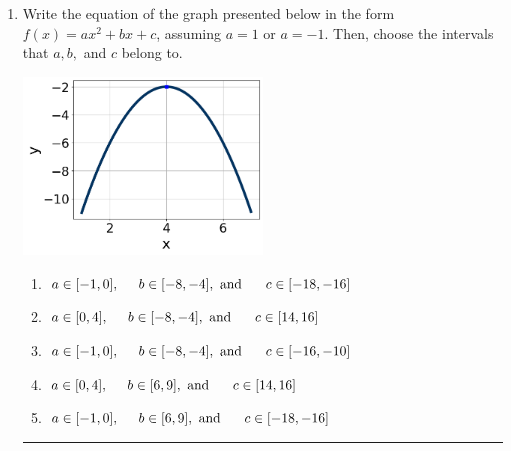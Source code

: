 \documentclass[14pt]{extbook}
\newcommand{\litem}[1]{\item#1\hspace*{-1cm}\rule{\textwidth}{0.4pt}}
\begin{document}
\begin{enumerate}
{\begin{enumerate}[label=\Alph*.]
\end{enumerate} }
\litem{
Write the equation of the graph presented below in the form $f(x)=ax^2+bx+c$, assuming  $a=1$ or $a=-1$. Then, choose the intervals that $a, b,$ and $c$ belong to.
\begin{center}
    \includegraphics[width=0.5\textwidth]{../Figures/quadraticGraphToEquationB.png}
\end{center}
\begin{enumerate}[label=\Alph*.]
\item \( a \in [-1, 0], \hspace*{5mm} b \in [-8, -4], \text{ and } \hspace*{5mm} c \in [-18, -16] \)
\item \( a \in [0, 4], \hspace*{5mm} b \in [-8, -4], \text{ and } \hspace*{5mm} c \in [14, 16] \)
\item \( a \in [-1, 0], \hspace*{5mm} b \in [-8, -4], \text{ and } \hspace*{5mm} c \in [-16, -10] \)
\item \( a \in [0, 4], \hspace*{5mm} b \in [6, 9], \text{ and } \hspace*{5mm} c \in [14, 16] \)
\item \( a \in [-1, 0], \hspace*{5mm} b \in [6, 9], \text{ and } \hspace*{5mm} c \in [-18, -16] \)

\end{enumerate} }
\end{enumerate}
\end{document}
